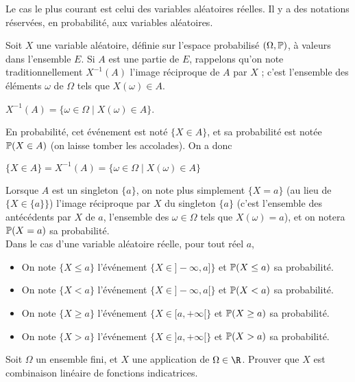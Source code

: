 \documentclass[12pt,a4paper]{report}
\begin{document}
Le cas le plus courant est celui des variables aléatoires réelles. Il y a des notations réservées, en probabilité, aux variables aléatoires.

\begin{remarque}[Notation]{}
Soit $X$ une variable aléatoire, définie sur l'espace probabilisé $(\Omega, \mathbb{P})$, à valeurs dans l'ensemble $E$. Si $A$ est une partie de $E$, rappelons qu'on note traditionnellement $X^{-1}(A)$ l'image réciproque de $A$ par $X$ ; c'est l'ensemble des éléments $\omega$ de $\Omega$ tels que $X(\omega) \in A$. 
\begin{center}
$X^{-1}(A) = \{\omega \in \Omega \mid X(\omega) \in A\}$.
\end{center}
\end{remarque}

En probabilité, cet événement est noté $\{X \in A \}$, et sa probabilité est notée $\mathbb{P}(X \in A)$ (on laisse tomber les accolades). On a donc 
\begin{center}
$\{X \in A \} = X^{-1}(A) = \{\omega \in \Omega \mid X(\omega) \in A\}$
\end{center}

Lorsque $A$ est un singleton $\{a\}$, on note plus simplement $\{X=a\}$ (au lieu de $\{X \in \{a\}\}$) l'image réciproque par $X$ du singleton $\{a\}$ (c'est l'ensemble des antécédents par $X$ de $a$, \ie l'ensemble des $\omega \in \Omega$ tels que $X(\omega) = a$), et on notera $\mathbb{P}(X = a)$ sa probabilité. \\

Dans le cas d'une variable aléatoire réelle, pour tout réel $a$, 
\begin{itemize}
\item On note $\{X \le a \}$ l'événement $\{X \in ]-\infty,a]\}$ et $\mathbb{P}(X \le a)$ sa probabilité. 
\item On note $\{X < a\}$ l'événement $\{X \in ]-\infty,a[\}$ et $\mathbb{P}(X < a)$ sa probabilité.
\item On note $\{X \ge a \}$ l'événement $\{X \in [a,+\infty[\}$ et $\mathbb{P}(X \ge a)$ sa probabilité.
\item On note $\{X > a\}$ l'événement $\{X \in ]a,+\infty[\}$ et $\mathbb{P}(X > a)$ sa probabilité.
\end{itemize}

\begin{exemple}[Exercice 8]{}
Soit $\Omega$ un ensemble fini, et $X$ une application de $\Omega \in \R$. Prouver que $X$ est combinaison linéaire de fonctions indicatrices.
\end{exemple}
\end{document}
